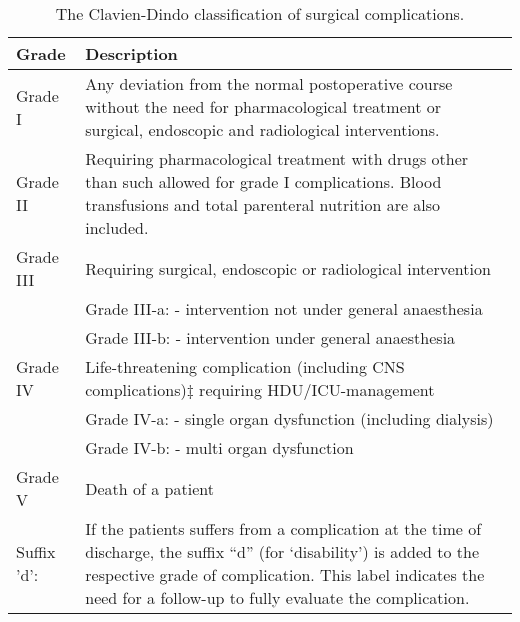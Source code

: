 \begin{sidewaystable}[htbp]
	\centering
	\caption{The Clavien-Dindo classification of surgical complications.}
	\label{table:clavien-dindo}	
	\renewcommand{\arraystretch}{1.7} %
	\setlength{\tabcolsep}{14pt} %
	\begin{tabular}{|l m{15cm}|}
		\hline
		Grade       & Description \\ \hline
		Grade I     & Any deviation from the normal postoperative course without the need for pharmacological treatment or surgical, endoscopic and radiological interventions.  \\
		Grade II    & Requiring pharmacological treatment with drugs other than such allowed for grade I complications. Blood transfusions and total parenteral nutrition are also included.  \\
		Grade III   & Requiring surgical, endoscopic or radiological intervention  \\
		            & Grade III-a: - intervention not under general anaesthesia \\
		            & Grade III-b: - intervention under general anaesthesia  \\
		Grade IV    & Life-threatening complication (including CNS complications)‡ requiring  HDU/ICU-management  \\
		            & Grade IV-a: - single organ dysfunction (including dialysis)     \\
		            & Grade IV-b: - multi organ dysfunction \\
		Grade V     & Death of a patient  \\ \hline
		Suffix 'd': & If the patients suffers from a complication at the time of discharge,  the suffix  “d”  (for ‘disability’) is added to the respective grade of complication. This label indicates the need for a follow-up to fully evaluate the complication. \\ \hline
	\end{tabular}
\end{sidewaystable}



 	
